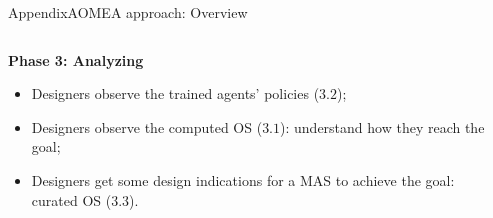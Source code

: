 \begin{frame}{Appendix}{AOMEA approach: Overview}

    \begin{columns}

        \begin{column}{0.6\textwidth}

            \textbf{Phase 3: Analyzing}

            \begin{itemize}
                \item Designers observe the trained agents' policies ($3.2$);
                \item Designers observe the computed OS ($3.1$): understand how they reach the goal;
                \item Designers get some design indications for a MAS to achieve the goal: curated OS ($3.3$).
            \end{itemize}


        \end{column}

        \begin{column}{0.4\textwidth}
            \centering
        \end{column}


\end{columns}
\end{frame}
